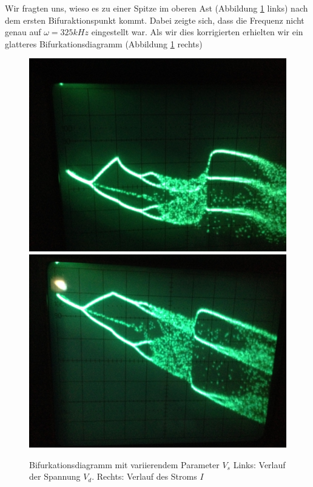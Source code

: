 \documentclass[12pt,a4paper]{article}
\begin{document}
Wir fragten uns, wieso es zu einer Spitze im oberen Ast (Abbildung \ref{fig:ldr-bifurc} links) nach dem ersten Bifuraktionspunkt kommt. Dabei zeigte sich, dass die Frequenz nicht genau auf $\omega=325kHz$ eingestellt war. Als wir dies korrigierten erhielten wir ein glatteres Bifurkationsdiagramm (Abbildung \ref{fig:ldr-bifurc} rechts)

\begin{figure}[!htbp]
\centering
\includegraphics[scale=0.18]{bif-ldr/bifurc-bad}
\includegraphics[scale=0.18]{bif-ldr/bifurc-good}
\caption{Bifurkationsdiagramm mit variierendem Parameter $V_s$ Links: Verlauf der Spannung $V_d$. Rechts: Verlauf des Stroms $I$}
\label{fig:ldr-bifurc}
\end{figure}
\end{document}

